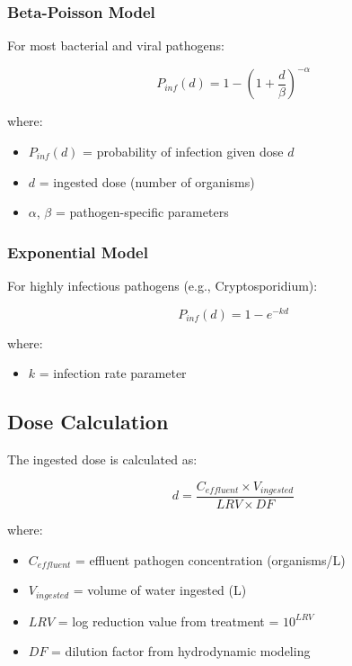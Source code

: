 \documentclass[11pt,a4paper]{article}
\begin{document}
\subsubsection{Beta-Poisson Model}

For most bacterial and viral pathogens:

\begin{equation}
P_{inf}(d) = 1 - \left(1 + \frac{d}{\beta}\right)^{-\alpha}
\end{equation}

where:
\begin{itemize}[leftmargin=*]
    \item $P_{inf}(d)$ = probability of infection given dose $d$
    \item $d$ = ingested dose (number of organisms)
    \item $\alpha$, $\beta$ = pathogen-specific parameters
\end{itemize}

\subsubsection{Exponential Model}

For highly infectious pathogens (e.g., Cryptosporidium):

\begin{equation}
P_{inf}(d) = 1 - e^{-kd}
\end{equation}

where:
\begin{itemize}[leftmargin=*]
    \item $k$ = infection rate parameter
\end{itemize}

\subsection{Dose Calculation}

The ingested dose is calculated as:

\begin{equation}
d = \frac{C_{effluent} \times V_{ingested}}{LRV \times DF}
\end{equation}

where:
\begin{itemize}[leftmargin=*]
    \item $C_{effluent}$ = effluent pathogen concentration (organisms/L)
    \item $V_{ingested}$ = volume of water ingested (L)
    \item $LRV$ = log reduction value from treatment = $10^{LRV}$
    \item $DF$ = dilution factor from hydrodynamic modeling
\end{itemize}
\end{document}
